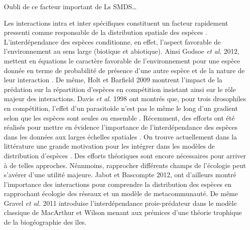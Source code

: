 Oubli de ce facteur important de Ls SMDS\ldots{}

Les interactions intra et inter spécifiques constituent un facteur
rapidement pressenti comme responsable de la distribution spatiale des
espèces \cite{Levin1974}. L'interdépendance des espèces conditionne, en
effet, l'aspect favorable de l'environnement au sens large (biotique et
abiotique). Ainsi Godsoe \textit{et al.} 2012, mettent en équations le
caractère favorable de l'environnement pour une espèce donnée en terme
de probabilité de présence d'une autre espèce et de la nature de leur
interaction \cite{Godsoe2012}. De même, Holt et Barfield 2009 montrent
l'impact de la prédation sur la répartition d'espèces en compétition
\cite{Holt2009} insistant ainsi sur le rôle majeur des interactions.
Davis \textit{et al.} 1998 ont montrés que, pour trois drosophiles en
compétition, l'effet d'un parasitoïde n'est pas le même le long d'un
gradient selon que les espèces sont seules ou ensemble \cite{Davis1998}.
Récemment, des efforts ont été réalisés pour mettre en évidence
l'importance de l'interdépendance des espèces dans les données aux
larges échelles spatiales \cite{Gotelli2010}. On trouve actuellement
dans la littérature une grande motivation pour les intégrer dans les
modèles de distribution d'espèces \cite{Kissling2011, Guisan2011}. Des
efforts théoriques sont encore nécessaires pour arriver à de telles
approches. Néanmoins, rapprocher différents champs de l'écologie peut
s'avérer d'une utilité majeure. Jabot et Bascompte \cite{Jabot2012}
2012, ont d'ailleurs montré l'importance des interactions pour
comprendre la distribution des espèces en rapprochant écologie des
réseaux et un modèle de metacommunauté. De même Gravel \textit{et al.}
2011 \cite{Gravel2011b} introduise l'interdépendance proie-prédateur
dans le modèle classique de MacArthur et Wilson menant aux prémices
d'une théorie trophique de la biogéographie des îles.

